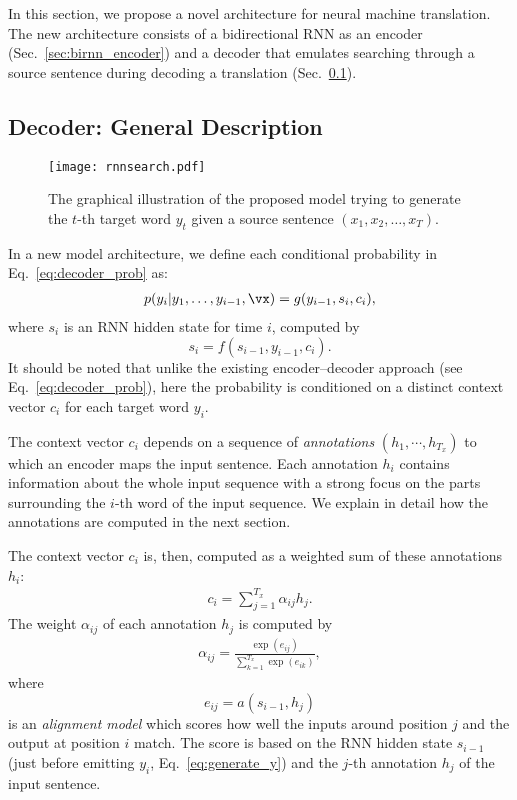 In this section, we propose a novel architecture for neural machine
translation.  The new architecture consists of a bidirectional RNN as an
encoder (Sec.~\ref{sec:birnn_encoder}) and a decoder that emulates
searching through a source sentence during decoding a translation
(Sec.~\ref{sec:search_decoder}). 

\subsection{Decoder: General Description}
\label{sec:search_decoder}

\begin{wrapfigure}{R}{0.3\textwidth}
    \centering
    \texttt{[image: rnnsearch.pdf]}
    \caption{
        The graphical illustration of the proposed model trying to
        generate the $t$-th target word $y_t$ given a source sentence $(x_1, x_2,
        \dots, x_T)$.
    }
    \label{fig:rnnsearch}
\end{wrapfigure}

In a new model architecture, we define each conditional probability in
Eq.~\eqref{eq:decoder_prob} as:
\begin{align}
    \label{eq:generate_y}
    p(y_{i}|y_1, \ldots, y_{i-1}, \vx) = g(y_{i-1}, s_{i}, c_i),
\end{align}
where $s_{i}$ is an RNN hidden state for time $i$, computed by
\[
    s_i = f(s_{i-1}, y_{i-1}, c_{i}).
\]
It should be noted that unlike the existing encoder--decoder approach (see
Eq.~\eqref{eq:decoder_prob}), here the probability is conditioned on a distinct
context vector $c_i$ for each target word $y_i$. 

The context vector $c_i$ depends on a sequence of {\em annotations} $(h_1,
\cdots, h_{T_x})$ to which an encoder maps the input sentence.  Each annotation
$h_i$ contains information about the whole input sequence with a strong focus
on the parts surrounding the $i$-th word of the input sequence. We explain in
detail how the annotations are computed in the next section.

The context vector $c_i$ is, then, computed as a weighted sum of these
annotations $h_i$:
\begin{align}
    \label{eq:context_vector}
    c_i = \sum_{j=1}^{T_x} \alpha_{ij} h_j.
\end{align}
The weight $\alpha_{ij}$ of each annotation $h_j$ is computed by 
\begin{align}
    \label{eq:annotation_weight}
    \alpha_{ij} = \frac{\exp\left(e_{ij}\right)}{\sum_{k=1}^{T_x} \exp\left(e_{ik}\right)},
\end{align}
where
\[
    e_{ij} = a(s_{i-1}, h_j)
\]
is an {\it alignment model} which scores how well the inputs around
position $j$ and the output at position $i$ match. The score is based on
the RNN hidden state $s_{i-1}$ (just before emitting $y_i$,
Eq.~\eqref{eq:generate_y}) and the $j$-th annotation $h_j$ of the input
sentence.

